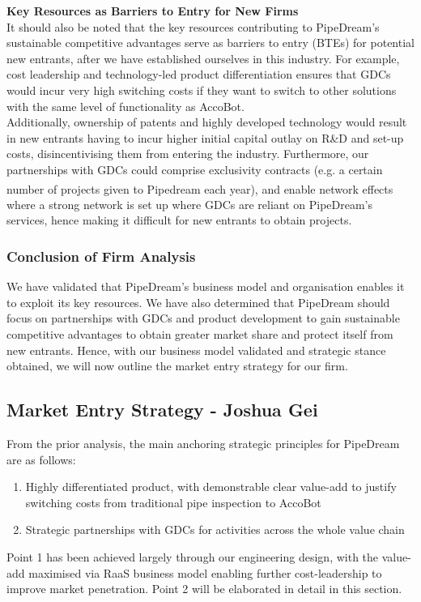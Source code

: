 \documentclass[11pt]{article}		%
\newcommand{\supercite}[1]{\textsuperscript{\cite{#1}}}		%
\begin{document}
	\textbf{Key Resources as Barriers to Entry for New Firms}
	\\It should also be noted that the key resources contributing to PipeDream's sustainable competitive advantages serve as barriers to entry (BTEs) for potential new entrants, after we have established ourselves in this industry. For example,	cost leadership and technology-led product differentiation ensures that GDCs would incur very high switching costs if they want to switch to other solutions with the same level of functionality as AccoBot. 
	\\ \hspace*{3ex}Additionally, ownership of patents and highly developed technology would result in new entrants having to incur higher initial capital outlay on R\&D and set-up costs, disincentivising them from entering the industry. Furthermore, our partnerships with GDCs could comprise exclusivity contracts (e.g. a certain number of projects given to Pipedream each year), and enable network effects \supercite{networkeffect} where a strong network is set up where GDCs are reliant on PipeDream's services, hence making it difficult for new entrants to obtain projects.
	
	\subsubsection{Conclusion of Firm Analysis}
	We have validated that PipeDream's business model and organisation enables it to exploit its key resources. We have also determined that PipeDream should focus on partnerships with GDCs and product development to gain sustainable competitive advantages to obtain greater market share and protect itself from new entrants. Hence, with our business model validated and strategic stance obtained, we will now outline the market entry strategy for our firm.
    
    \subsection[Market Entry Strategy]{Market Entry Strategy - Joshua Gei} \label{marketEntry}
    
    From the prior analysis, the main anchoring strategic principles for PipeDream are as follows: 
        \begin{enumerate}
        \item Highly differentiated product, with demonstrable clear value-add to justify switching costs from traditional pipe inspection to AccoBot
        \item Strategic partnerships with GDCs for activities across the whole value chain
        \end{enumerate}
    Point 1 has been achieved largely through our engineering design, with the value-add maximised via RaaS business model enabling further cost-leadership to improve market penetration. Point 2 will be elaborated in detail in this section.  
    
\end{document}
